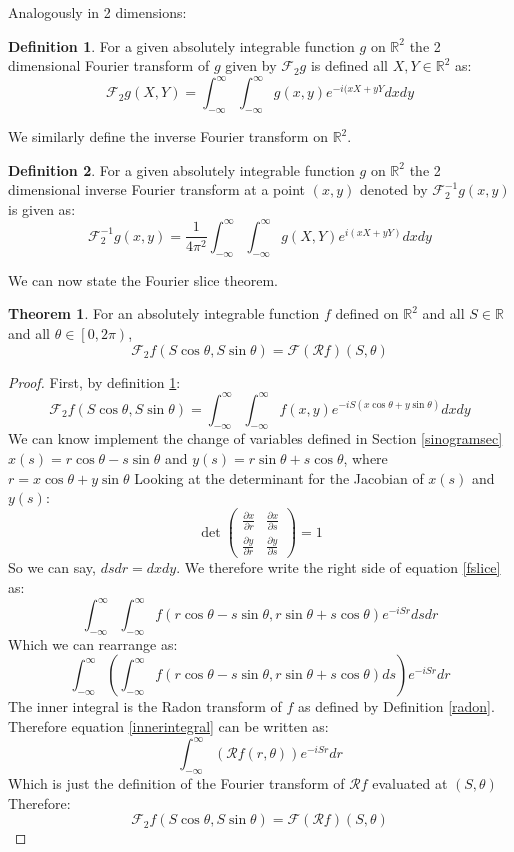 \documentclass{article}
\theoremstyle{definition}
\newtheorem{definition}{Definition}[section]
\newtheorem{theorem}{Theorem}
\begin{document}
Analogously in 2 dimensions:
\begin{definition}
For a given absolutely integrable function $g$ on $\mathbb{R} ^ 2$ the 2 dimensional Fourier transform of $g$ given by $\mathcal{F}_2 g$ is defined all $X, Y \in \mathbb{R} ^ 2$ as:
$$
\mathcal{F}_2 g(X, Y) =  \int_{-\infty}^{\infty} \int_{-\infty}^{\infty} g(x, y) e^{- i (x X + yY}dxdy
$$
\label{2dfourier}
\end{definition}

We similarly define the inverse Fourier transform on $\mathbb{R}^2$.

\begin{definition}
For a given absolutely integrable function $g$ on $\mathbb{R} ^ 2$ the 2 dimensional inverse Fourier transform at a point $(x,y)$ denoted by $\mathcal{F}_2 ^{-1} g(x,y)$ is given as:
$$
\mathcal{F}_2 ^{-1} g(x, y) = \frac{1}{4 \pi^2} \int_{-\infty}^{\infty} \int_{-\infty}^{\infty} g(X, Y) e^{i (x X + yY)}dxdy
$$
\end{definition}

We can now state the Fourier slice theorem.
\begin{theorem}
For an absolutely integrable function $f$ defined on $\mathbb{R}^2$ and all $S \in \mathbb{R}$ and all $\theta \in \left[ 0, 2\pi \right)$,
$$
\mathcal{F}_2 f(S \cos \theta, S \sin \theta) = \mathcal{F}(\mathcal{R}f)(S, \theta)
$$
\end{theorem}
\begin{proof} 
First, by definition \ref{2dfourier}:
$$
\mathcal{F}_2 f(S \cos \theta, S \sin \theta) =  \int_{-\infty}^{\infty} \int_{-\infty}^{\infty} f(x, y) e^{- i S(x \cos \theta + y \sin \theta )}dxdy
$$ \label{fslice}
We can know  implement the change of variables defined in Section \ref{sinogramsec} \\
$x(s) = r \cos \theta - s \sin \theta$ and $y(s) = r \sin \theta + s \cos \theta$, where $r = x \cos \theta + y \sin \theta$
Looking at the determinant for the Jacobian of $x(s)$ and $y(s)$:
$$
\det \begin{pmatrix}
       \frac{\partial x}{\partial r} & \frac{\partial x}{\partial s} \\
       \frac{\partial y}{\partial r} & \frac{\partial y}{\partial s}
   \end{pmatrix} = 1
$$
So we can say, $dsdr = dxdy$. We therefore write the right side of equation \ref{fslice} as:
$$
\int_{-\infty}^{\infty} \int_{-\infty}^{\infty} f(r \cos \theta - s \sin \theta, r \sin \theta + s \cos \theta) e^{- i S r}dsdr
$$
Which we can rearrange as:
$$
\int_{-\infty}^{\infty} \left( \int_{-\infty}^{\infty} f(r \cos \theta - s \sin \theta, r \sin \theta + s \cos \theta)ds  \right) e^{- i S r}dr
\label{innerintegral}
$$
The inner integral is the Radon transform of $f$ as defined by Definition \ref{radon}. Therefore equation \ref{innerintegral} can be written as:
$$
\int_{-\infty}^{\infty} \left( \mathcal{R} f (r, \theta) \right) e^{- i S r}dr
$$
Which is just the definition of the Fourier transform of $\mathcal{R} f$ evaluated at $(S, \theta)$\\
Therefore:
$$
\mathcal{F}_2 f(S \cos \theta, S \sin \theta) = \mathcal{F}(\mathcal{R}f)(S, \theta)
$$
\end{proof}




\end{document}
